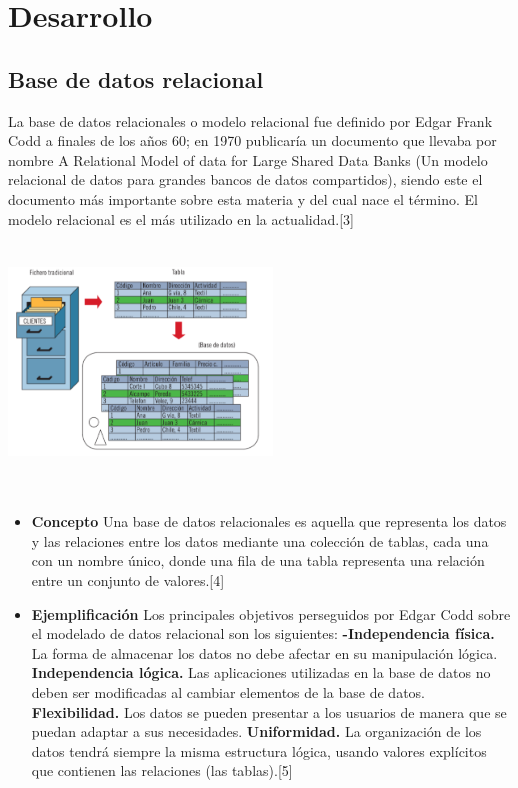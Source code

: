 \documentclass[twoside,twocolumn]{article}
\begin{document}
\section{Desarrollo}

\subsection{Base de datos relacional}
La base de datos relacionales o modelo relacional 
fue definido por Edgar Frank Codd a finales de los años
60; en 1970 publicaría un documento que llevaba por nombre
A Relational Model of data for Large Shared Data Banks 
(Un modelo relacional de datos para grandes bancos de datos compartidos), 
siendo este el documento más importante sobre esta materia y del cual nace el término. El modelo relacional es el más utilizado en la actualidad.[3]
\includegraphics[width=7cm, height=7cm]{img/base de datos relacional.png}
\begin{itemize}
\item  \textbf{Concepto }
Una base de datos relacionales es aquella que
representa los datos y las relaciones entre los
datos mediante una colección de tablas, cada una
con un nombre único, donde una fila de una tabla 
representa una relación entre un conjunto de valores.[4]
\item  \textbf{Ejemplificación}
Los principales objetivos perseguidos por 
Edgar Codd sobre el modelado de datos relacional son los siguientes: 
\textbf{-Independencia física.} La forma de almacenar los datos no debe afectar en su manipulación lógica.
\textbf{Independencia lógica.} Las aplicaciones utilizadas en la base de datos no deben ser modificadas al cambiar elementos de la base de datos. 
\textbf{Flexibilidad.} Los datos se pueden presentar a los usuarios de manera que se puedan adaptar a sus necesidades. 
\textbf{Uniformidad.} La organización de los datos tendrá siempre la misma estructura lógica, usando valores explícitos que contienen las relaciones (las tablas).[5]

\end{itemize}
\end{document}
